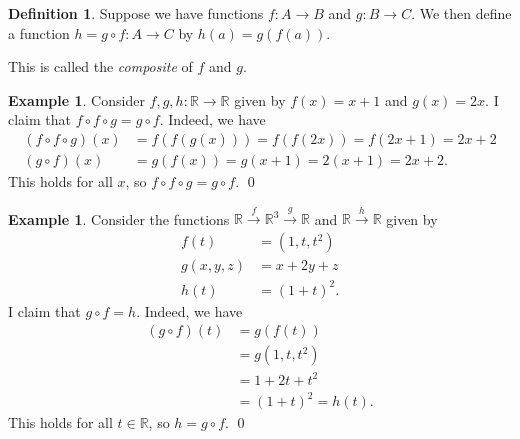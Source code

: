 \documentclass[a4paper]{book}
\newcommand{\PURPLE}[1]{{\color{purple}#1}}
\newcommand{\R}         {{\mathbb{R}}}
\newcommand{\xra}       {\xrightarrow}
\renewcommand{\:}{\colon}
\newcommand{\DEFN}[1]{\PURPLE{\emph{#1}}}
\theoremstyle{definition}
\newtheorem{definition}[theorem]{Definition}
\newtheorem{example}[theorem]{Example}
\begin{document}
\begin{definition}
 Suppose we have functions $f\:A\xra{}B$ and $g\:B\xra{}C$.  We then
 define a function \DEFN{$h=g\circ f\:A\xra{}C$} by $h(a)=g(f(a))$.
 \begin{center}
 \end{center}
 This is called the \DEFN{composite} of $f$ and $g$.
\end{definition}

\begin{example}
 Consider $f,g,h\:\R\xra{}\R$ given by $f(x)=x+1$ and $g(x)=2x$.  I
 claim that $f\circ f\circ g=g\circ f$.  Indeed, we have
 \begin{align*}
  (f\circ f\circ g)(x) &=
   f(f(g(x))) = f(f(2x)) = f(2x+1) = 2x+2 \\
  (g\circ f)(x) &= g(f(x))=g(x+1)= 2(x+1)= 2x+2.
 \end{align*}
 This holds for all $x$, so $f\circ f\circ g=g\circ f$. \qed
\end{example}
\begin{example}
 Consider the functions
 $\R\xra{f}\R^3\xra{g}\R$ and $\R\xra{h}\R$ given by
 \begin{align*}
  f(t)     &= (1,t,t^2) \\
  g(x,y,z) &= x+2y+z \\
  h(t)     &= (1+t)^2.
 \end{align*}
 I claim that $g\circ f=h$.  Indeed, we have
 \begin{align*}
  (g\circ f)(t) &= g(f(t)) \\
                &= g(1,t,t^2) \\
                &= 1 + 2t + t^2 \\
                &= (1+t)^2 = h(t).
 \end{align*}
 This holds for all $t\in\R$, so $h=g\circ f$. \qed
\end{example}
\end{document}
